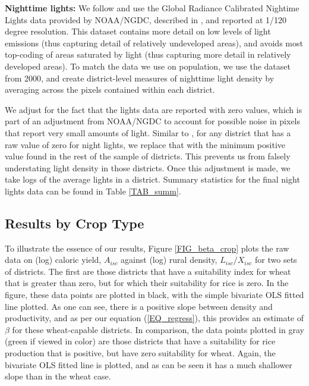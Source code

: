 \documentclass[11pt]{article}
\begin{document}
\vspace{.5cm}\noindent\textbf{Nighttime lights:} We follow \citet{hssw2016} and use the Global Radiance Calibrated Nightime Lights data provided by NOAA/NGDC, described in \citet{Elvidge1999}, and reported at 1/120 degree resolution. This dataset contains more detail on low levels of light emissions (thus capturing detail of relatively undeveloped areas), and avoids most top-coding of areas saturated by light (thus capturing more detail in relatively developed areas). To match the data we use on population, we use the dataset from 2000, and create district-level measures of nighttime light density by averaging across the pixels contained within each district.

We adjust for the fact that the lights data are reported with zero values, which is part of an adjustment from NOAA/NGDC to account for possible noise in pixels that report very small amounts of light. Similar to \citet{hssw2016}, for any district that has a raw value of zero for night lights, we replace that with the minimum positive value found in the rest of the sample of districts. This prevents us from falsely understating light density in those districts. Once this adjustment is made, we take logs of the average lights in a district. Summary statistics for the final night lights data can be found in Table \ref{TAB_summ}.

\subsection{Results by Crop Type}
To illustrate the essence of our results, Figure \ref{FIG_beta_crop} plots the raw data on (log) caloric yield, $A_{isc}$ against (log) rural density, $L_{isc}/X_{isc}$ for two sets of districts. The first are those districts that have a suitability index for wheat that is greater than zero, but for which their suitability for rice is zero. In the figure, these data points are plotted in black, with the simple bivariate OLS fitted line plotted. As one can see, there is a positive slope between density and productivity, and as per our equation (\ref{EQ_regress}), this provides an estimate of $\beta$ for these wheat-capable districts. In comparison, the data points plotted in gray (green if viewed in color) are those districts that have a suitability for rice production that is positive, but have zero suitability for wheat. Again, the bivariate OLS fitted line is plotted, and as can be seen it has a much shallower slope than in the wheat case.
\end{document}
